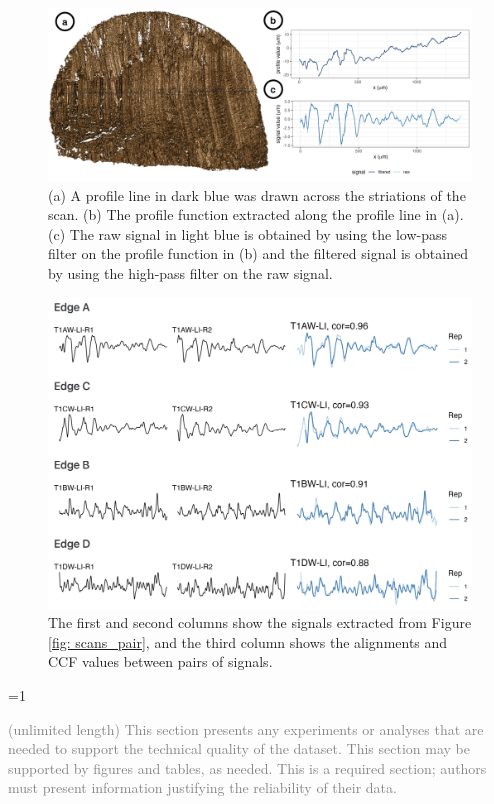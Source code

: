 \documentclass[fleqn,10pt]{wlscirep}
\newcommand{\ifinstruction}{1} %
\begin{document}
\begin{figure}[ht]
\centering
\includegraphics[width=0.9\linewidth]{T1AW-LI-R1-profiles-signals.png}
\caption{(a) A profile line in dark blue was drawn across the striations of the scan. (b) The profile function extracted along the profile line in (a). (c) The raw signal in light blue is obtained by using the low-pass filter on the profile function in (b) and the filtered signal is obtained by using the high-pass filter on the raw signal.}
\label{fig: T1AW-LI-R1-profiles-signals}
\end{figure}

\begin{figure}[ht]
\centering
\includegraphics[width=0.8\linewidth]{signals_pair_alignment.png}
\caption{The first and second columns show the signals extracted from Figure \ref{fig: scans_pair}, and the third column shows the alignments and CCF values between pairs of signals.}
\label{fig: signals_pair_alignment}
\end{figure}

\ifnum \ifinstruction=1

\textcolor{gray}{(unlimited length) This section presents any experiments or analyses that are needed to support the technical quality of the dataset. This section may be supported by figures and tables, as needed. This is a required section; authors must present information justifying the reliability of their data.}
\end{document}
